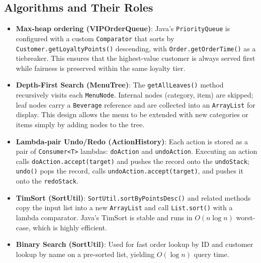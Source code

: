 \documentclass[11pt,a4paper]{article}
\begin{document}
\subsection{Algorithms and Their Roles}
\begin{itemize}[leftmargin=*]
    \item \textbf{Max-heap ordering (VIPOrderQueue)}: Java's \texttt{PriorityQueue} is configured with a custom \texttt{Comparator} that sorts by \texttt{Customer.getLoyaltyPoints()} descending, with \texttt{Order.getOrderTime()} as a tiebreaker. This ensures that the highest-value customer is always served first while fairness is preserved within the same loyalty tier.
    \item \textbf{Depth-First Search (MenuTree)}: The \texttt{getAllLeaves()} method recursively visits each \texttt{MenuNode}. Internal nodes (category, item) are skipped; leaf nodes carry a \texttt{Beverage} reference and are collected into an \texttt{ArrayList} for display. This design allows the menu to be extended with new categories or items simply by adding nodes to the tree.
    \item \textbf{Lambda-pair Undo/Redo (ActionHistory)}: Each action is stored as a pair of \texttt{Consumer<T>} lambdas: \texttt{doAction} and \texttt{undoAction}. Executing an action calls \texttt{doAction.accept(target)} and pushes the record onto the \texttt{undoStack}; \texttt{undo()} pops the record, calls \texttt{undoAction.accept(target)}, and pushes it onto the \texttt{redoStack}.
    \item \textbf{TimSort (SortUtil)}: \texttt{SortUtil.sortByPointsDesc()} and related methods copy the input list into a new \texttt{ArrayList} and call \texttt{List.sort()} with a lambda comparator. Java's TimSort is stable and runs in $O(n \log n)$ worst-case, which is highly efficient.
    \item \textbf{Binary Search (SortUtil)}: Used for fast order lookup by ID and customer lookup by name on a pre-sorted list, yielding $O(\log n)$ query time.
\end{itemize}
\end{document}
